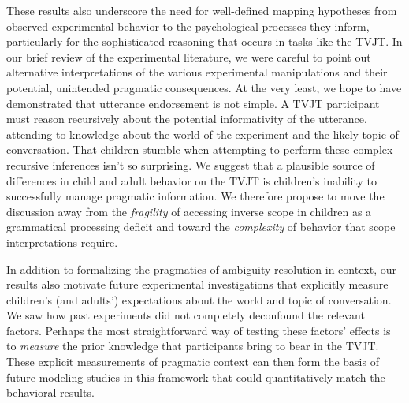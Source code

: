 \documentclass[10pt,a4paper]{article}
\begin{document}
These results also underscore the need for well-defined mapping hypotheses from observed experimental behavior to the psychological processes they inform, particularly for the sophisticated reasoning that occurs in tasks like the TVJT. 
In our brief review of the experimental literature, we were careful to point out 
alternative interpretations of the various experimental manipulations and their  potential, unintended pragmatic consequences.
At the very least, we hope to have demonstrated that utterance endorsement is not simple. A TVJT participant must reason recursively about the potential  informativity of the utterance, attending to knowledge about the world of the experiment and the likely topic of conversation. That children stumble when attempting to perform these complex recursive inferences isn't so surprising. 
We suggest that a plausible source of differences in child and adult behavior on the TVJT is  children's inability  to successfully manage pragmatic information. We therefore propose to move the discussion away from the \emph{fragility} of accessing inverse scope in children as a grammatical processing deficit and toward the \emph{complexity} of behavior that scope interpretations require.

 In addition to formalizing the pragmatics of ambiguity resolution in context, our results also motivate future experimental investigations that explicitly measure children's (and adults') expectations about the world and topic of conversation. We saw how past experiments did not completely deconfound the relevant factors. Perhaps the most straightforward way of testing these factors' effects is to \emph{measure} the prior knowledge that participants bring to bear in the TVJT.
 These explicit measurements of pragmatic context can then form the basis of future modeling studies in this framework that could quantitatively match the behavioral results.
 
\end{document}
